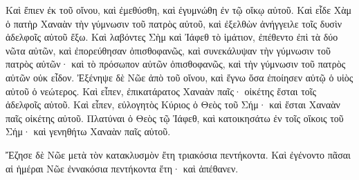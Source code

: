 {Καὶ ἔπιεν ἐκ τοῦ οἴνου, καὶ ἐμεθύσθη, καὶ ἐγυμνώθη ἐν τῷ οἴκῳ αὐτοῦ.
Καὶ εἶδε Χὰμ ὁ πατὴρ Χαναὰν τὴν γύμνωσιν τοῦ πατρὸς αὐτοῦ, καὶ ἐξελθὼν ἀνήγγειλε τοῖς δυσὶν ἀδελφοῖς αὐτοῦ ἔξω.
Καὶ λαβόντες Σὴμ καὶ Ἰάφεθ τὸ ἱμάτιον, ἐπέθεντο ἐπὶ τὰ δύο νῶτα αὐτῶν, καὶ ἐπορεύθησαν ὀπισθοφανῶς, καὶ συνεκάλυψαν τὴν γύμνωσιν τοῦ πατρὸς αὐτῶν· καὶ τὸ πρόσωπον αὐτῶν ὀπισθοφανῶς, καὶ τὴν γύμνωσιν τοῦ πατρὸς αὐτῶν οὐκ εἶδον.
Ἐξένηψε δὲ Νῶε ἀπὸ τοῦ οἴνου, καὶ ἔγνω ὅσα ἐποίησεν αὐτῷ ὁ υἱὸς αὐτοῦ ὁ νεώτερος.
Καὶ εἶπεν, ἐπικατάρατος Χαναὰν παῖς· οἰκέτης ἔσται τοῖς ἀδελφοῖς αὐτοῦ.
Καὶ εἶπεν, εὐλογητὸς Κύριος ὁ Θεὸς τοῦ Σήμ· καὶ ἔσται Χαναὰν παῖς οἰκέτης αὐτοῦ.
Πλατύναι ὁ Θεὸς τῷ Ἰάφεθ, καὶ κατοικησάτω ἐν τοῖς οἴκοις τοῦ Σήμ· καὶ γενηθήτω Χαναὰν παῖς αὐτοῦ.
\par }{\PP {}Ἔζησε δὲ Νῶε μετὰ τὸν κατακλυσμὸν ἔτη τριακόσια πεντήκοντα.
Καὶ ἐγένοντο πᾶσαι αἱ ἡμέραι Νῶε ἐννακόσια πεντήκοντα ἔτη· καὶ ἀπέθανεν.

}
